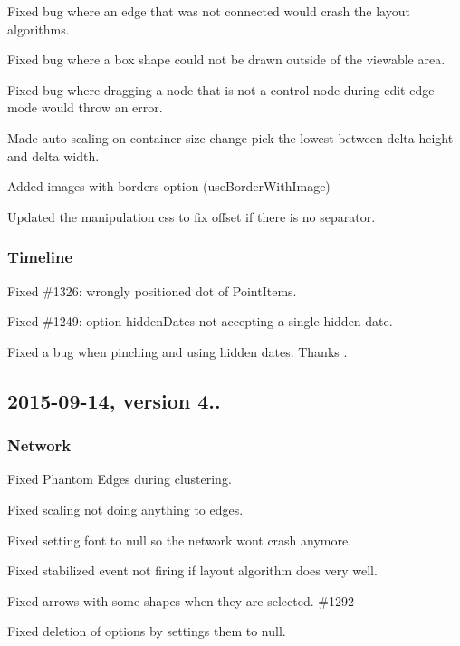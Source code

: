 \begin{DoxyItemize}
\item Fixed bug where an edge that was not connected would crash the layout algorithms.
\item Fixed bug where a box shape could not be drawn outside of the viewable area.
\item Fixed bug where dragging a node that is not a control node during edit edge mode would throw an error.
\item Made auto scaling on container size change pick the lowest between delta height and delta width.
\item Added images with borders option (use\+Border\+With\+Image)
\item Updated the manipulation css to fix offset if there is no separator.
\end{DoxyItemize}

\subsubsection*{Timeline}


\begin{DoxyItemize}
\item Fixed \#1326\+: wrongly positioned dot of Point\+Items.
\item Fixed \#1249\+: option {\ttfamily hidden\+Dates} not accepting a single hidden date.
\item Fixed a bug when pinching and using hidden dates. Thanks .
\end{DoxyItemize}

\subsection*{2015-\/09-\/14, version 4..}

\subsubsection*{Network}


\begin{DoxyItemize}
\item Fixed Phantom Edges during clustering.
\item Fixed scaling not doing anything to edges.
\item Fixed setting font to null so the network won\textquotesingle{}t crash anymore.
\item Fixed stabilized event not firing if layout algorithm does very well.
\item Fixed arrows with some shapes when they are selected. \#1292
\item Fixed deletion of options by settings them to null.
\end{DoxyItemize}

